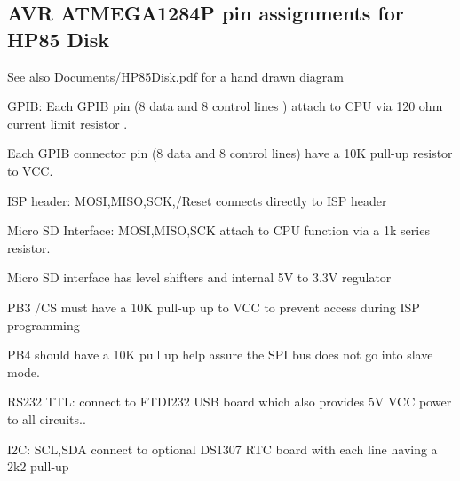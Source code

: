 \subsection*{A\+VR A\+T\+M\+E\+G\+A1284P pin assignments for H\+P85 Disk}


\begin{DoxyItemize}
\item \begin{DoxySeeAlso}{See also}
Documents/\+H\+P85\+Disk.\+pdf for a hand drawn diagram
\end{DoxySeeAlso}

\item G\+P\+IB\+: Each G\+P\+IB pin (8 data and 8 control lines ) attach to C\+PU via 120 ohm current limit resistor .
\begin{DoxyItemize}
\item Each G\+P\+IB connector pin (8 data and 8 control lines) have a 10K pull-\/up resistor to V\+CC.
\end{DoxyItemize}
\item I\+SP header\+: M\+O\+SI,M\+I\+SO,S\+CK,/\+Reset connects directly to I\+SP header
\item Micro SD Interface\+: M\+O\+SI,M\+I\+SO,S\+CK attach to C\+PU function via a 1k series resistor.
\begin{DoxyItemize}
\item Micro SD interface has level shifters and internal 5V to 3.\+3V regulator
\item P\+B3 /\+CS must have a 10K pull-\/up up to V\+CC to prevent access during I\+SP programming
\item P\+B4 should have a 10K pull up help assure the S\+PI bus does not go into slave mode.
\end{DoxyItemize}
\item R\+S232 T\+TL\+: connect to F\+T\+D\+I232 U\+SB board which also provides 5V V\+CC power to all circuits..
\item I2C\+: S\+CL,S\+DA connect to optional D\+S1307 R\+TC board with each line having a 2k2 pull-\/up 
\begin{DoxyPre}\end{DoxyPre}




\end{DoxyItemize}
